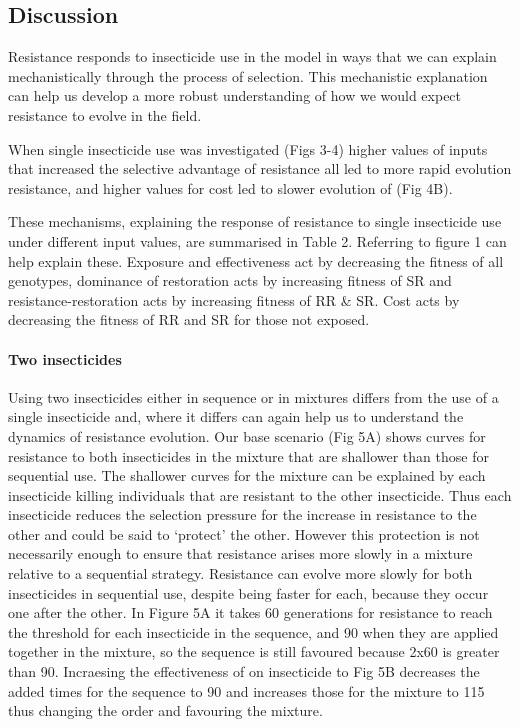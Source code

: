 \documentclass[11pt,]{article}
\let\oldparagraph\paragraph
\renewcommand{\paragraph}[1]{\oldparagraph{#1}\mbox{}}
\begin{document}
\subsection{Discussion}\label{discussion}

Resistance responds to insecticide use in the model in ways that we can
explain mechanistically through the process of selection. This
mechanistic explanation can help us develop a more robust understanding
of how we would expect resistance to evolve in the field.

When single insecticide use was investigated (Figs 3-4) higher values of
inputs that increased the selective advantage of resistance all led to
more rapid evolution resistance, and higher values for cost led to
slower evolution of (Fig 4B).

These mechanisms, explaining the response of resistance to single
insecticide use under different input values, are summarised in Table 2.
Referring to figure 1 can help explain these. Exposure and effectiveness
act by decreasing the fitness of all genotypes, dominance of restoration
acts by increasing fitness of SR and resistance-restoration acts by
increasing fitness of RR \& SR. Cost acts by decreasing the fitness of
RR and SR for those not exposed.

\paragraph{Two insecticides}\label{two-insecticides-1}

Using two insecticides either in sequence or in mixtures differs from
the use of a single insecticide and, where it differs can again help us
to understand the dynamics of resistance evolution. Our base scenario
(Fig 5A) shows curves for resistance to both insecticides in the mixture
that are shallower than those for sequential use. The shallower curves
for the mixture can be explained by each insecticide killing individuals
that are resistant to the other insecticide. Thus each insecticide
reduces the selection pressure for the increase in resistance to the
other and could be said to `protect' the other. However this protection
is not necessarily enough to ensure that resistance arises more slowly
in a mixture relative to a sequential strategy. Resistance can evolve
more slowly for both insecticides in sequential use, despite being
faster for each, because they occur one after the other. In Figure 5A it
takes 60 generations for resistance to reach the threshold for each
insecticide in the sequence, and 90 when they are applied together in
the mixture, so the sequence is still favoured because 2x60 is greater
than 90. Incraesing the effectiveness of on insecticide to Fig 5B
decreases the added times for the sequence to 90 and increases those for
the mixture to 115 thus changing the order and favouring the mixture.
\end{document}
